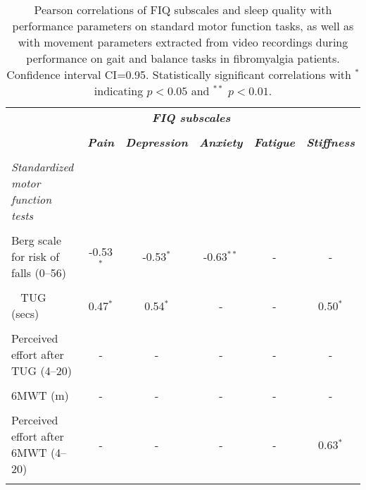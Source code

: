 \begin{landscape}
\begin{table}[ht]
\caption{Pearson correlations of FIQ subscales and sleep quality with performance parameters on standard motor function tasks, as well as  with movement parameters extracted from video recordings during performance on gait and balance tasks in fibromyalgia patients. Confidence interval CI=0.95. Statistically significant correlations with \textbf{$^\ast$} indicating $p < 0.05$ and \textbf{$^{\ast\ast}$} $p< 0.01$. }
\begin{tabular}{lccccc}
        \hline
        & \multicolumn{4}{c}{\emph{\textbf{FIQ subscales}}}\\ \\
 & \emph{\textbf{Pain}} & \emph{\textbf{Depression}} & \emph{\textbf{Anxiety}} & \emph{\textbf{Fatigue}} & \emph{\textbf{Stiffness}} \\ \\ \hline
\emph{Standardized motor function tests}  & & & & & \\ \\
\hspace{0.3cm} Berg scale for risk of falls (0--56)  & -0.53\textbf{$^\ast$} & -0.53\textbf{$^\ast$} & -0.63\textbf{$^{\ast\ast}$} & - & -\\ \\
\
\hspace{0.3cm} TUG (secs)  & 0.47\textbf{$^\ast$} & 0.54\textbf{$^\ast$}  & - & - & 0.50\textbf{$^\ast$} \\ \\
\hspace{0.3cm} Perceived effort after TUG (4--20)  & - & - & - & - & - \\ \\
\hspace{0.3cm} 6MWT (m)  & - & - & - & - & - \\ \\
\hspace{0.3cm} Perceived effort after 6MWT (4--20)  & - & - & - & - & 0.63\textbf{$^\ast$} \\ \\ \hline


\end{tabular}
\end{table}
\end{landscape}
